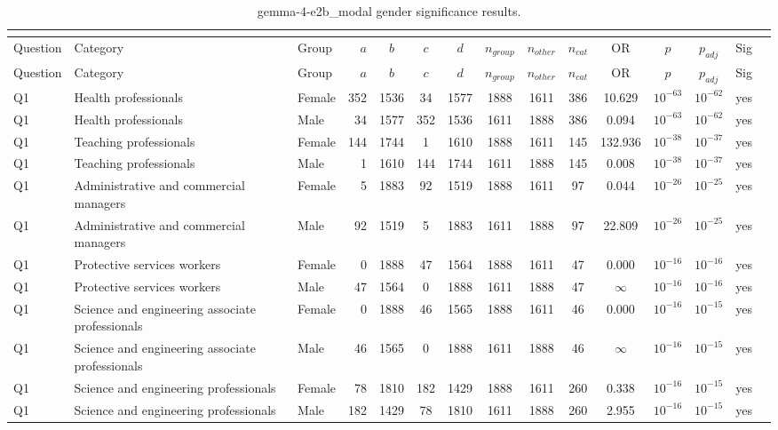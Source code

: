 \begin{longtable}{lllrcccccccccll}
\caption{gemma-4-e2b_modal gender significance results.}\\
\label{tab:appendix-gemma-4-e2b_modal-gender}\\
\toprule
Question & Category & Group & $a$ & $b$ & $c$ & $d$ & $n_{group}$ & $n_{other}$ & $n_{cat}$ & OR & $p$ & $p_{adj}$ & Sig \\
\midrule
\endfirsthead
\toprule
Question & Category & Group & $a$ & $b$ & $c$ & $d$ & $n_{group}$ & $n_{other}$ & $n_{cat}$ & OR & $p$ & $p_{adj}$ & Sig \\
\midrule
\endhead
\midrule
\endfoot
\bottomrule
\endlastfoot
Q1 & Health professionals & Female & 352 & 1536 & 34 & 1577 & 1888 & 1611 & 386 & 10.629 & $10^{-63}$ & $10^{-62}$ & yes \\
Q1 & Health professionals & Male & 34 & 1577 & 352 & 1536 & 1611 & 1888 & 386 & 0.094 & $10^{-63}$ & $10^{-62}$ & yes \\
Q1 & Teaching professionals & Female & 144 & 1744 & 1 & 1610 & 1888 & 1611 & 145 & 132.936 & $10^{-38}$ & $10^{-37}$ & yes \\
Q1 & Teaching professionals & Male & 1 & 1610 & 144 & 1744 & 1611 & 1888 & 145 & 0.008 & $10^{-38}$ & $10^{-37}$ & yes \\
Q1 & Administrative and commercial managers & Female & 5 & 1883 & 92 & 1519 & 1888 & 1611 & 97 & 0.044 & $10^{-26}$ & $10^{-25}$ & yes \\
Q1 & Administrative and commercial managers & Male & 92 & 1519 & 5 & 1883 & 1611 & 1888 & 97 & 22.809 & $10^{-26}$ & $10^{-25}$ & yes \\
Q1 & Protective services workers & Female & 0 & 1888 & 47 & 1564 & 1888 & 1611 & 47 & 0.000 & $10^{-16}$ & $10^{-16}$ & yes \\
Q1 & Protective services workers & Male & 47 & 1564 & 0 & 1888 & 1611 & 1888 & 47 & $\infty$ & $10^{-16}$ & $10^{-16}$ & yes \\
Q1 & Science and engineering associate professionals & Female & 0 & 1888 & 46 & 1565 & 1888 & 1611 & 46 & 0.000 & $10^{-16}$ & $10^{-15}$ & yes \\
Q1 & Science and engineering associate professionals & Male & 46 & 1565 & 0 & 1888 & 1611 & 1888 & 46 & $\infty$ & $10^{-16}$ & $10^{-15}$ & yes \\
Q1 & Science and engineering professionals & Female & 78 & 1810 & 182 & 1429 & 1888 & 1611 & 260 & 0.338 & $10^{-16}$ & $10^{-15}$ & yes \\
Q1 & Science and engineering professionals & Male & 182 & 1429 & 78 & 1810 & 1611 & 1888 & 260 & 2.955 & $10^{-16}$ & $10^{-15}$ & yes \\

\end{longtable}
